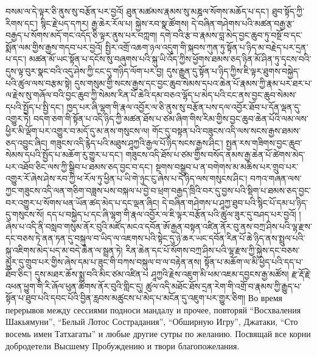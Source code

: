 བསམ་ལ་དེ་ལྟར་ཅི་ནུས་སུ་བརྩོན་པར་བྱའོ། ཐུན་མཚམས་རྣམས་སུ་མཎྜལ་སོགས་མཆོད་པ་དང་། ཐུབ་སྟོད་ཀྱི་རིགས་དང་། སྙིང་རྗེ་པད་དཀར། རྒྱ་ཆེར་རོལ་པ། སྐྱེས་རབ་སྣ་ཚོགས། དེ་བཞིན་གཤེགས་པའི་མཚན་བརྒྱ་རྩ་བརྒྱད་པ་སོགས་མདོ་གང་འདོད་ཅི་ལྟར་ནུས་པར་བཀླག། དགེ་བའི་རྩ་བ་རྣམས་བླ་མེད་བྱང་ཆུབ་ཏུ་བསྔོ་བ་དང་སྨོན་ལམ་གྱིས་རྒྱས་གདབ་པར་བྱའོ། སྤྱིར་འགྲོ་འཆག་ཉལ་འདུག་གི་སྐབས་ཀུན་ཏུ་སྟོན་པ་ཉིད་མ་བརྗེད་པར་དྲན་པ་དང་། མཚན་མོ་ཡང་སྟོན་པ་དངོས་སུ་བཞུགས་པའི་སྐུ་ཡི་འོད་ཀྱིས་ཕྱོགས་ཐམས་ཅད་ཉིན་མོ་ཤིན་ཏུ་དྭངས་བའི་དུས་ལྟ་བུར་སྣང་བའི་འདུ་ཤེས་ཀྱི་ངང་དུ་གཉིད་ལོག་པར་བྱ། དུས་རྒྱུན་དུ་སྟོན་པ་ཉིད་ཀྱིས་ཇི་ལྟར་ཐུགས་བསྐྱེད་པའི་ཚུལ་ལས་བརྩམ་སྟེ། དུས་གསུམ་གྱི་སངས་རྒྱས་དང་བྱང་ཆུབ་སེམས་དཔའ་ཆེན་པོ་རྣམས་ཀྱི་རྣམ་པར་ཐར་པ་ལ་རྗེས་སུ་གཞོལ་བའི་བྱང་ཆུབ་ཀྱི་སེམས་རིན་པོ་ཆེའི་དམ་བཅའ་ལྷོད་པ་མེད་པའི་ངང་ནས་བྱང་ཆུབ་སེམས་དཔའི་སྤྱོད་པ་སྤྱི་དང་། ཁྱད་པར་ཞི་ལྷག་གི་རྣལ་འབྱོར་ལ་ཅི་ནུས་སུ་བརྩོན་པས་དལ་འབྱོར་ཐོབ་པ་དོན་ལྡན་དུ་འགྱུར་ཏེ། བདག་ཅག་གི་སྟོན་པ་འདི་ཉིད་ཀྱི་མཚན་ཐོས་པ་ཙམ་ཞིག་གིས་རིམ་གྱིས་བྱང་ཆུབ་ཆེན་པོའི་ལམ་ལས་ཕྱིར་མི་ལྡོག་པར་འགྱུར་བ་མདོ་དུ་མ་ནས་གསུངས་ལ། གོང་དུ་བསྟན་པའི་བཟུངས་འདི་ལས་སངས་རྒྱས་ཐམས་ཅད་འབྱུང་ཞིང། གཟུངས་འདི་རྙེད་པའི་མཐུས་ཤཱཀྱའི་རྒྱལ་པོ་ཉིད་སངས་རྒྱས་ཤིང་། སྤྱན་རས་གཟིགས་བྱང་ཆུབ་སེམས་དཔའི་སྤྱོད་པ་མཆོག་རུ་གྱུར་པ་དང་། གཟུངས་འདི་ཐོས་པ་ཙམ་གྱིས་བསོད་ནམས་རྒྱ་ཆེན་པོ་ཚེགས་མེད་པར་འཐོབ་ཅིང་ལས་ཀྱི་སྒྲིབ་པ་ཐམས་ཅད་བྱང་བ་དང་། སྔགས་བསྒྲུབ་པ་ན་བགེགས་མ་མཆིས་པར་གྲུབ་པར་འགྱུར་རོ་ཞེས་ཤེས་རབ་ཀྱི་ཕ་རོལ་ཏུ་ཕྱིན་པ་ཡི་གེ་ཉུང་ངུ་ཞེས་པ་དེ་ཉིད་ལས་གསུངས་ཤིང་། བཀའ་གཞན་ལས་ཀྱང་གཟུངས་འདི་ལན་གཅིག་བཟླས་པས་བསྐལ་པ་བྱེ་བ་ཕྲག་བརྒྱད་ཁྲིའི་བར་དུ་བྱས་པའི་སྡིག་པ་ཐམས་ཅད་བྱང་བར་འགྱུར་པ་སོགས་ཕན་ཡོན་ཚད་མེད་པ་དང་ལྡན་ཞིང། དེ་བཞིན་གཤེགས་པ་ཤཱཀྱ་ཐུབ་པའི་སྙིང་པོ་དམ་པ་ཉིད་དུ་གསུངས་སོ། དད་པ་བསྐྱེད་པ་དང་ཞི་ལྷག་གི་རྣལ་འབྱོར་ལ་ཇི་ལྟར་བརྩོན་པའི་ཚུལ་ཟུར་དུ་བཤད་པར་བྱའོ། །ཞེས་པ་འདི་ནི་བསླབ་གསུམ་ནོར་བུའི་མཛོད་མངའ་དབོན་ཨོ་རྒྱན་བསྟན་འཛིན་ནོར་བུ་ནས་བཀྲ་ཤིས་པའི་ལྷ་རྫས་དང་བཅས་ཏེ་ནན་ཏན་དུ་བསྐུལ་བ་ཡིད་ལ་འཇགས་པའི་སྟེང་དུ་ཉེ་ཆར་ཡང་དབོན་རིན་པོ་ཆེ་ཉིད་ནས་སྤྲུལ་པའི་སྐུ་འཇིགས་མེད་པད་མ་བདེ་ཆེན་ལ་སྦྲན་ཏེ། རིན་ཆེན་དང་པོ་སོགས་བཀྲ་ཤིས་པའི་ལྷ་རྫས་ཀྱི་སྐྱེས་དང་བཅས་མྱུར་དུ་གྲུབ་པར་གྱིས་ཞེས་དམ་པ་ཟུང་གི་བཀས་བསྐུལ་བ་ལ་བརྟེན་ནས། སྟོན་པ་མཆོག་ལ་མི་ཕྱེད་པའི་དད་པ་ཐོབ་ཅིང་། དུས་མཐར་ཆོས་སྨྲ་བའི་མིང་ཙམ་འཛིན་པ ཤཱཀྱའི་རྗེས་འཇུག་མི་ཕམ་འཇམ་དབྱངས་རྒྱ་མཚོས། རྫ་རྡོ་རྗེ་འཕན་ཕྱུག་གི་རི་ཞོལ་ཕུན་ཚོགས་ནོར་བུའི་གླིང་དུ། ཚུལ་འདི་མཐོང་ཐོས་དྲན་རེག་གི་འགྲོ་བ་རྣམས་ཀྱི་རྒྱུད་པ་སྟོན་པ་ཐུབ་པའི་དབང་པོའི་བྱིན་རླབས་མཚུངས་པ་མེད་པ་མངོན་དུ་འཇུག་པར་གྱུར་ཅིག།
\ru
\normalsize
\newpage
\scriptsize
Во время перерывов между сессиями подноси мандалу и прочее,
повторяй “Восхваления Шакьямуни”, “Белый Лотос Сострадания”, “Обширную Игру”,
Джатаки, “Сто восемь имен Татхагаты” и любые другие сутры по желанию.
Посвящай все корни добродетели Высшему Пробуждению и твори благопожелания.
